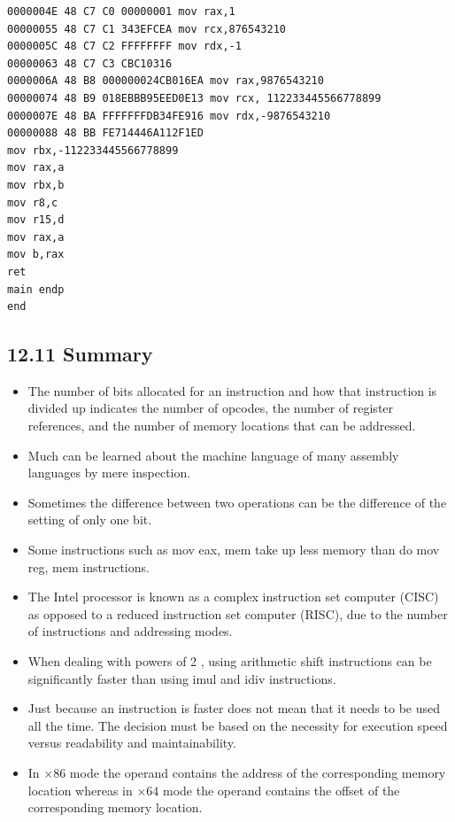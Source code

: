 \documentclass[10pt]{book}
\begin{document}
\begin{center}
\begin{center}
\begin{center}
\begin{center}
\begin{center}
\begin{verbatim}
0000004E 48 C7 C0 00000001 mov rax,1
00000055 48 C7 C1 343EFCEA mov rcx,876543210
0000005C 48 C7 C2 FFFFFFFF mov rdx,-1
00000063 48 C7 C3 CBC10316
0000006A 48 B8 000000024CB016EA mov rax,9876543210
00000074 48 B9 018EBBB95EED0E13 mov rcx, 112233445566778899
0000007E 48 BA FFFFFFFDB34FE916 mov rdx,-9876543210
00000088 48 BB FE714446A112F1ED
mov rbx,-112233445566778899
mov rax,a
mov rbx,b
mov r8,c
mov r15,d
mov rax,a
mov b,rax
ret
main endp
end
\end{verbatim}

\subsection*{12.11 Summary}
\begin{itemize}
  \item The number of bits allocated for an instruction and how that instruction is divided up indicates the number of opcodes, the number of register references, and the number of memory locations that can be addressed.
  \item Much can be learned about the machine language of many assembly languages by mere inspection.
  \item Sometimes the difference between two operations can be the difference of the setting of only one bit.
  \item Some instructions such as mov eax, mem take up less memory than do mov reg, mem instructions.
  \item The Intel processor is known as a complex instruction set computer (CISC) as opposed to a reduced instruction set computer (RISC), due to the number of instructions and addressing modes.
  \item When dealing with powers of 2 , using arithmetic shift instructions can be significantly faster than using imul and idiv instructions.
  \item Just because an instruction is faster does not mean that it needs to be used all the time. The decision must be based on the necessity for execution speed versus readability and maintainability.
  \item In $\times 86$ mode the operand contains the address of the corresponding memory location whereas in $\times 64$ mode the operand contains the offset of the corresponding memory location.
\end{itemize}


\end{center}
\end{center}
\end{center}
\end{center}
\end{center}
\end{document}
